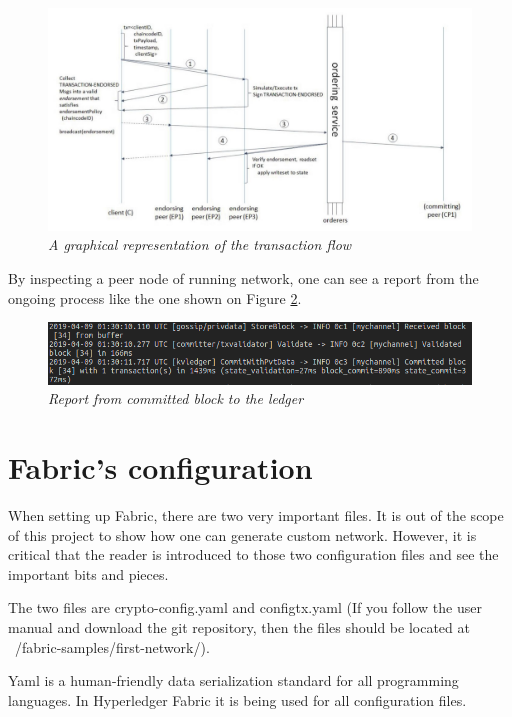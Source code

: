 \documentclass[a4paper,11pt]{report}
\begin{document}
\begin{figure}[h]
\centering
  \includegraphics[width=16cm]{image_preview-7.jpeg}
  \caption{\textit{A graphical representation of the transaction flow \cite{transactionFlow}}}
  \label{transactionFlow}
\end{figure}

By inspecting a peer node of running network, one can see a report from the ongoing process like the one shown on Figure \ref{block}.

\begin{figure}[h]
\centering
  \includegraphics[width=16cm]{block.png}
  \caption{\textit{Report from committed block to the ledger}}
  \label{block}
\end{figure} 

\section{Fabric's configuration}
\label{configuration}
When setting up Fabric, there are two very important files. It is out of the scope of this project to show how one can generate custom network. However, it is critical that the reader is introduced to those two configuration files and see the important bits and pieces. 

	The two files are crypto-config.yaml and configtx.yaml (If you follow the user manual and download the git repository, then the files should be located at ~/fabric-samples/first-network/). 
	
	Yaml is a human-friendly data serialization standard for all programming languages. In Hyperledger Fabric it is being used for all configuration files. 
\end{document}
